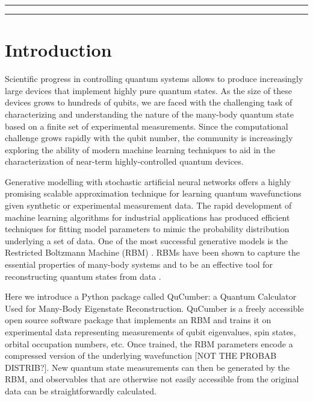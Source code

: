 \documentclass[submission, Phys]{SciPost}
\begin{document}
\vspace{10pt}
\noindent\rule{\textwidth}{1pt}
\tableofcontents\thispagestyle{fancy}
\noindent\rule{\textwidth}{1pt}
\vspace{10pt}


\section{Introduction}

Scientific progress in controlling quantum systems allows to produce increasingly large devices 
that implement highly pure quantum states. As the size of these devices grows to hundreds of qubits, 
we are faced with the challenging task of characterizing and understanding the nature of the 
many-body quantum state based on a finite set of experimental measurements. Since the computational 
challenge grows rapidly with the qubit number, the community is increasingly exploring the ability of modern 
machine learning techniques to aid in the characterization of near-term highly-controlled quantum devices.

Generative modelling with stochastic artificial neural networks offers a highly promising scalable approximation technique 
for learning quantum wavefunctions given synthetic or experimental measurement data.  The rapid development of 
machine learning algorithms for industrial applications has produced efficient techniques for fitting model parameters to mimic the probability distribution underlying a set of data.  One of the most successful generative models is the Restricted Boltzmann Machine (RBM) \cite{Smolensky}.  RBMs have been shown to capture the essential properties of many-body systems and to be an effective tool for reconstructing quantum states from data \cite{Torlai2016thermo, torlai2018tomography, CarleoTroyer2017Science,ChenWang2018,GlasserCirac2018}.

Here we introduce a Python package called QuCumber: a Quantum Calculator Used for Many-Body Eigenstate Reconstruction. 
QuCumber is a freely accessible open source software package that implements an RBM and trains it on experimental data 
representing measurements of qubit eigenvalues, spin states, orbital occupation numbers, etc. 
Once trained, the RBM parameters encode a compressed version of the underlying wavefunction [NOT THE PROBAB DISTRIB?]. 
New quantum state measurements can then be generated by the RBM, and observables that are otherwise 
not easily accessible from the original data can be straightforwardly calculated.
\end{document}
